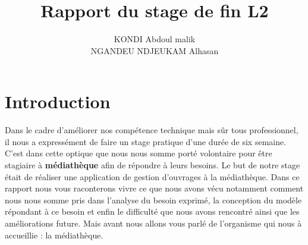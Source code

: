 \documentclass[12pt,a4paper]{article}
\author{KONDI Abdoul malik \\ NGANDEU NDJEUKAM Alhasan}
\title{Rapport du stage de fin L2}
\begin{document}
\maketitle
\tableofcontents
\newpage

\section{Introduction}
Dans le cadre d'améliorer nos compétence technique mais sûr tous professionnel, il nous a expressément
de faire un stage pratique d'une durée de six semaine. C'est dans cette optique que nous nous somme
porté volontaire pour être stagiaire à \textbf{médiathèque} afin de répondre à leurs besoins.
Le but de notre stage était de réaliser une application de gestion d'ouvrages à la médiathèque.
Dans ce rapport nous vous raconterons vivre ce que nous avons vécu notamment comment nous nous somme
pris dans l'analyse du besoin exprimé, la conception du modèle répondant à ce besoin et enfin le 
difficulté que nous avons rencontré ainsi que les améliorations future. Mais avant nous allons vous
parlé de l'organisme qui nous à accueillie : la médiathèque.
\end{document}
